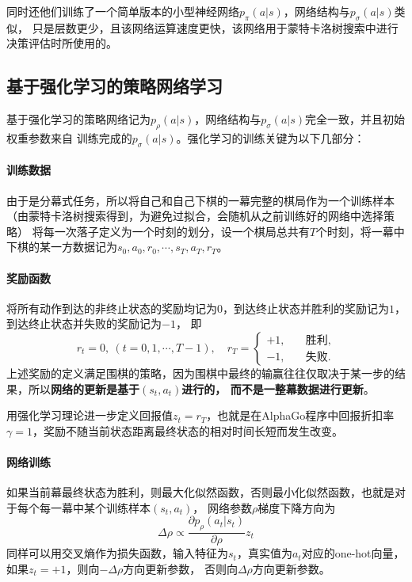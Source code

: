 \documentclass[12pt, a4paper, oneside]{ctexart}
\numberwithin{equation}{section}  %
\begin{document}
同时还他们训练了一个简单版本的小型神经网络$p_{\pi}(a|s)$，网络结构与$p_{\sigma}(a|s)$类似，
只是层数更少，且该网络运算速度更快，该网络用于蒙特卡洛树搜索中进行决策评估时所使用的。

\subsection{基于强化学习的策略网络学习}
基于强化学习的策略网络记为$p_{\rho}(a|s)$，网络结构与$p_{\sigma}(a|s)$完全一致，并且初始权重参数来自
训练完成的$p_{\sigma}(a|s)$。强化学习的训练关键为以下几部分：
\paragraph{训练数据} 由于是分幕式任务，所以将自己和自己下棋的一幕完整的棋局作为一个训练样本
（由蒙特卡洛树搜索得到，为避免过拟合，会随机从之前训练好的网络中选择策略）
将每一次落子定义为一个时刻的划分，设一个棋局总共有$T$个时刻，将一幕中下棋的某一方数据记为$s_0,a_0,r_0,\cdots,s_{T},a_{T},r_{T}$。
\paragraph{奖励函数} 将所有动作到达的非终止状态的奖励均记为$0$，到达终止状态并胜利的奖励记为$1$，到达终止状态并失败的奖励记为$-1$，
即
\begin{equation*}
 r_t = 0,\ (t=0,1,\cdots,T-1),\quad r_{T} = \begin{cases}
    +1,&\quad \text{胜利},\\
    -1,&\quad \text{失败}.
\end{cases}
\end{equation*}
上述奖励的定义满足围棋的策略，因为围棋中最终的输赢往往仅取决于某一步的结果，所以\textbf{网络的更新是基于$(s_t,a_t)$进行的，
而不是一整幕数据进行更新}。

用强化学习理论进一步定义回报值$z_t = r_T$，也就是在AlphaGo程序中回报折扣率$\gamma=1$，奖励不随当前状态距离最终状态的相对时间长短而发生改变。

\paragraph{网络训练}如果当前幕最终状态为胜利，则最大化似然函数，否则最小化似然函数，也就是对于每个每一幕中某个训练样本$(s_t,a_t)$，
网络参数$\rho$梯度下降方向为
\begin{equation*}
    \Delta \rho\propto\frac{\partial p_{\rho}(a_t|s_t)}{\partial \rho}z_t
\end{equation*}
同样可以用交叉熵作为损失函数，输入特征为$s_t$，真实值为$a_t$对应的one-hot向量，如果$z_t=+1$，则向$-\Delta\rho$方向更新参数，
否则向$\Delta\rho$方向更新参数。
\end{document}
